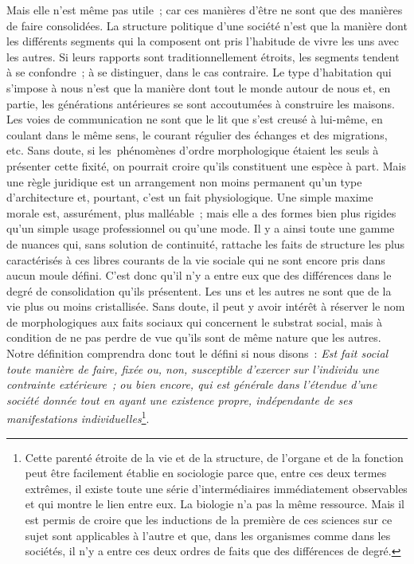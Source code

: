 \documentclass[french,twoside]{book} %
\newcommand\chapterclose{} %
\begin{document}
Mais elle n’est même pas utile ; car ces manières d’être ne sont que des manières de faire consolidées. La structure politique d’une société n’est que la manière dont les différents segments qui la composent ont pris l’habitude de vivre les uns avec les autres. Si leurs rapports sont traditionnellement étroits, les segments tendent à se confondre ; à se distinguer, dans le cas contraire. Le type d’habitation qui s’impose à nous n’est que la manière dont tout le monde autour de nous et, en partie, les générations antérieures se sont accoutumées à construire les maisons. Les voies de communication ne sont que le lit que s’est creusé à lui-même, en coulant dans le même sens, le courant régulier des échanges et des migrations, etc. Sans doute, si les phénomènes d’ordre morphologique étaient les seuls à présenter cette fixité, on pourrait croire qu’ils constituent une espèce à part. Mais une règle juridique est un arrangement non moins permanent qu’un type d’architecture et, pourtant, c’est un fait physiologique. Une simple maxime morale est, assurément, plus malléable ; mais elle a des formes bien plus rigides qu’un simple usage professionnel ou qu’une mode. Il y a ainsi toute une gamme de nuances qui, sans solution de continuité, rattache les faits de structure les plus caractérisés à ces libres courants de la vie sociale qui ne sont encore pris dans aucun moule défini. C’est donc qu’il n’y a entre eux que des différences dans le degré de consolidation qu’ils présentent. Les uns et les autres ne sont que de la vie plus ou moins cristallisée. Sans doute, il peut y avoir intérêt à réserver le nom de morphologiques aux faits sociaux qui concernent le substrat social, mais à condition de ne pas perdre de vue qu’ils sont de même nature que les autres. Notre définition comprendra donc tout le défini si nous disons : {\itshape Est fait social toute manière de faire, fixée ou, non, susceptible d’exercer sur l’individu une contrainte extérieure ; ou bien encore, qui est générale dans l’étendue d’une société donnée tout en ayant une existence propre, indépendante de ses manifestations individuelles}\footnote{ Cette parenté étroite de la vie et de la structure, de l’organe et de la fonction peut être facilement établie en sociologie parce que, entre ces deux termes extrêmes, il existe toute une série d’intermédiaires immédiatement observables et qui montre le lien entre eux. La biologie n’a pas la même ressource. Mais il est permis de croire que les inductions de la première de ces sciences sur ce sujet sont applicables à l’autre et que, dans les organismes comme dans les sociétés, il n’y a entre ces deux ordres de faits que des différences de degré.}.
\chapterclose
\end{document}
